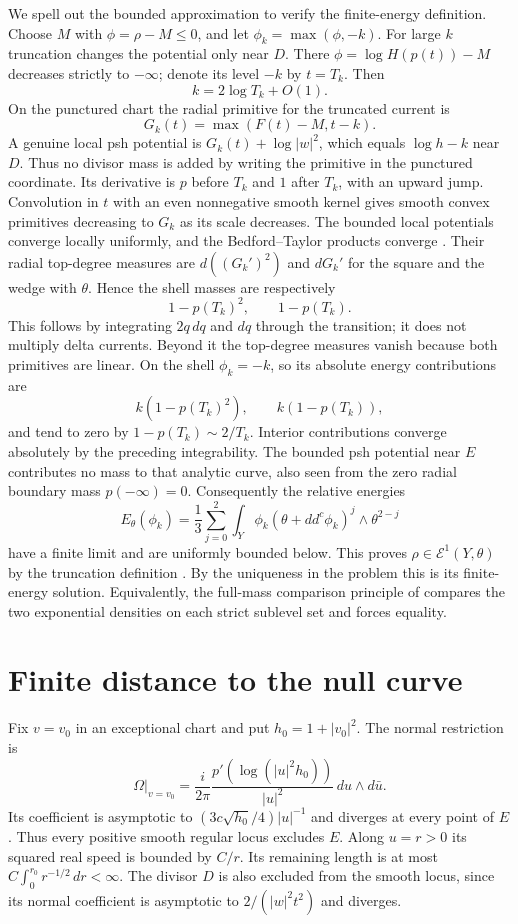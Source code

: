 \documentclass[11pt]{article}
\newcommand{\ddc}{dd^c}
\begin{document}
We spell out the bounded approximation to verify the finite-energy
definition. Choose $M$ with $\phi=\rho-M\leq0$, and let
$\phi_k=\max(\phi,-k)$. For large $k$ truncation changes the potential
only near $D$. There $\phi=\log H(p(t))-M$ decreases strictly to
$-\infty$; denote its level $-k$ by $t=T_k$. Then
\[
 k=2\log T_k+O(1).
\]
On the punctured chart the radial primitive for the truncated current is
\[
 G_k(t)=\max(F(t)-M,t-k).
\]
A genuine local psh potential is $G_k(t)+\log|w|^2$, which equals
$\log h-k$ near $D$. Thus no divisor mass is added by writing the
primitive in the punctured coordinate. Its derivative is $p$ before
$T_k$ and $1$ after $T_k$, with an upward jump.
Convolution in $t$ with an even nonnegative smooth kernel gives smooth
convex primitives decreasing to $G_k$ as its scale decreases. The bounded
local potentials converge locally uniformly, and the Bedford--Taylor
products converge \cite[Theorems 2.1 and 2.10]{BT}. Their radial
top-degree measures are $d((G_k')^2)$ and $dG_k'$ for the square and the
wedge with $\theta$. Hence the shell masses are respectively
\[
 1-p(T_k)^2,\qquad 1-p(T_k).
\]
This follows by integrating $2q\,dq$ and $dq$ through the transition;
it does not multiply delta currents. Beyond it the top-degree measures
vanish because both primitives are linear. On the shell $\phi_k=-k$,
so its absolute energy contributions are
\[
 k(1-p(T_k)^2),\qquad k(1-p(T_k)),
\]
and tend to zero by $1-p(T_k)\sim2/T_k$. Interior contributions converge
absolutely by the preceding integrability. The bounded psh potential
near $E$ contributes no mass to that analytic curve, also seen from
the zero radial boundary mass $p(-\infty)=0$.
Consequently the relative energies
\[
 E_\theta(\phi_k)=\frac13\sum_{j=0}^2
       \int_Y\phi_k(\theta+\ddc\phi_k)^j\wedge\theta^{2-j}
\]
have a finite limit and are uniformly bounded below. This proves
$\rho\in\mathcal E^1(Y,\theta)$ by the truncation definition
\cite[equation (2.1), Proposition 2.4 and Definition 2.5]{BBGZ}. By the uniqueness in the
problem this is its finite-energy solution. Equivalently, the full-mass
comparison principle of \cite[Corollary 2.3]{BEGZ} compares the two
exponential densities on each strict sublevel set and forces equality.

\section{Finite distance to the null curve}
Fix $v=v_0$ in an exceptional chart and put $h_0=1+|v_0|^2$.
The normal restriction is
\[
 \Omega\big|_{v=v_0}=\frac i{2\pi}
        \frac{p'(\log(|u|^2h_0))}{|u|^2}\,du\wedge d\bar u.
\]
Its coefficient is asymptotic to
$(3c\sqrt{h_0}/4)|u|^{-1}$ and diverges at every point of $E$.
Thus every positive smooth regular locus excludes $E$.
Along $u=r>0$ its squared real speed is bounded by $C/r$.
Its remaining length is at most $C\int_0^{r_0}r^{-1/2}\,dr<\infty$.
The divisor $D$ is also excluded from the smooth locus, since its normal
coefficient is asymptotic to $2/(|w|^2t^2)$ and diverges.
\end{document}
